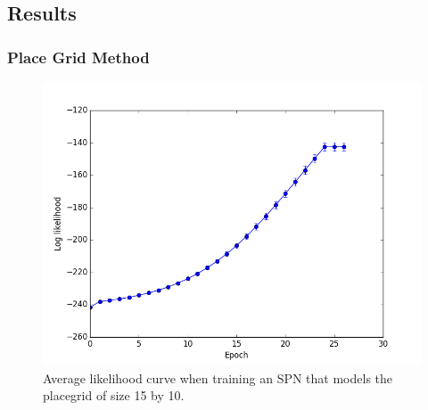 \documentclass[10pt, titlepage]{article}
\theoremstyle{definition}
\begin{document}
\subsection{Results}\label{section:results}

\subsubsection{Place Grid Method}

\begin{figure}[!htb]
    \centering
    \captionsetup{width=.6\linewidth}
    \includegraphics[scale=0.4]{images/likelihood.png}
    \caption{Average likelihood curve when training an SPN that models the placegrid of size 15 by 10. }
    \label{fig:likelihood}
\end{figure}
\end{document}
